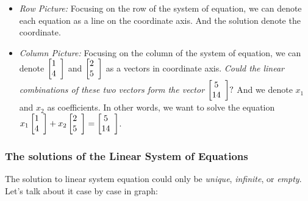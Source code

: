 \begin{itemize}
\item
\emph{Row Picture:} Focusing on the row of the system of equation, we can denote each equation as a line on the coordinate axis. And the solution denote the coordinate.

\item
\emph{Column Picture:} Focusing on the column of the system of equation, we can denote 
$\left[
\begin{array}{@{}cc|c@{}}
1\\
4
\end{array}
\right]$ and $\left[
\begin{array}{@{}cc|c@{}}
2\\
5
\end{array}
\right]
$ as a vectors in coordinate axis. \textit{Could the linear combinations of these two vectors form the vector}
$\left[
\begin{array}{@{}cc|c@{}}
5\\
14
\end{array}
\right]?$ And we denote $x_1$ and $x_2$ as coefficients. In other words, we want to solve the equation 
$
x_1\left[
\begin{array}{@{}cc|c@{}}
1\\
4
\end{array}\right] + x_2\left[
\begin{array}{@{}cc|c@{}}
2\\
5
\end{array}\right] = \left[
\begin{array}{@{}cc|c@{}}
5\\
14
\end{array}
\right]$.

\end{itemize}





\subsubsection{The solutions of the Linear System of Equations}
The solution to linear system equation could only be \emph{unique}, \emph{infinite}, or \emph{empty}. Let's talk about it case by case in graph:

